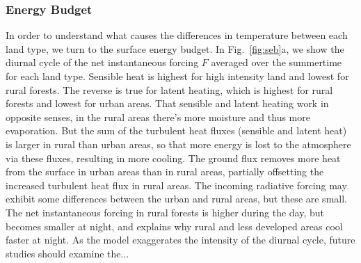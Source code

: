\documentclass[draft,linenumbers]{agujournal}
\begin{document}
\subsubsection{ Energy Budget}
In order to understand what causes the differences in temperature between each land type, we turn to the surface energy budget. In Fig.~\ref{fig:seb}a, we show the diurnal cycle of the net instantaneous forcing $F$ averaged over the summertime for each land type. Sensible heat is highest for high intensity land and lowest for rural forests. The reverse is true for latent heating, which is highest for rural forests and lowest for urban areas. That sensible and latent heating work in opposite senses, in the rural areas there's more moisture and thus more evaporation. But the sum of the turbulent heat fluxes (sensible and latent heat) is larger in rural than urban areas, so that more energy is lost to the atmosphere via these fluxes, resulting in more cooling. The ground flux removes more heat from the surface in urban areas than in rural areas, partially offsetting the increased turbulent heat flux in rural areas. The incoming radiative forcing may exhibit some differences between the urban and rural areas, but these are small. 
The net instantaneous forcing in rural forests is higher during the day, but becomes smaller at night, and explains why rural and less developed areas cool faster at night. 
As the model exaggerates the intensity of the diurnal cycle, future studies should examine the...
%
\end{document}
